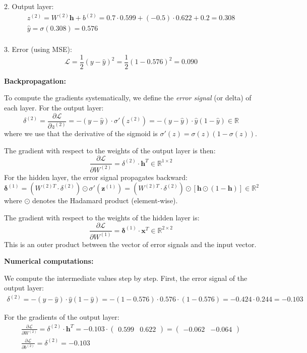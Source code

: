 2. Output layer:
\begin{gather*}
    z^{(2)} = W^{(2)}\mathbf{h} + b^{(2)} = 0.7 \cdot 0.599 + (-0.5) \cdot 0.622 + 0.2 = 0.308\\
    \hat{y} = \sigma(0.308) = 0.576\\
\end{gather*}

3. Error (using \gls{MSE}):
\[
	\mathcal{L} = \frac{1}{2}(y - \hat{y})^2 = \frac{1}{2}(1 - 0.576)^2 = 0.090
\]

\textbf{Backpropagation:}

To compute the gradients systematically, we define the \textit{error signal} (or delta) of each layer. For the output layer:
\[
	\delta^{(2)} = \frac{\partial \mathcal{L}}{\partial z^{(2)}} = -(y - \hat{y}) \cdot \sigma'(z^{(2)}) = -(y - \hat{y}) \cdot \hat{y}(1 - \hat{y}) \in \mathbb{R}
\]
where we use that the derivative of the sigmoid is \(\sigma'(z) = \sigma(z)(1-\sigma(z))\).

The gradient with respect to the weights of the output layer is then:
\[
	\frac{\partial \mathcal{L}}{\partial W^{(2)}} = \delta^{(2)} \cdot \mathbf{h}^T \in \mathbb{R}^{1 \times 2}
\]
For the hidden layer, the error signal propagates backward:
\[
	\boldsymbol{\delta}^{(1)} = \left( W^{(2)T} \cdot \delta^{(2)} \right) \odot \sigma'(\mathbf{z}^{(1)}) = \left( W^{(2)T} \cdot \delta^{(2)} \right) \odot \left[ \mathbf{h} \odot (1 - \mathbf{h}) \right] \in \mathbb{R}^{2}
\]
where \(\odot\) denotes the Hadamard product (element-wise).

The gradient with respect to the weights of the hidden layer is:
\[
	\frac{\partial \mathcal{L}}{\partial W^{(1)}} = \boldsymbol{\delta}^{(1)} \cdot \mathbf{x}^T \in \mathbb{R}^{2 \times 2}
\]
This is an outer product between the vector of error signals and the input vector.

\textbf{Numerical computations:}

We compute the intermediate values step by step. First, the error signal of the output layer:
\begin{gather*}
	\delta^{(2)} = -(y - \hat{y}) \cdot \hat{y}(1 - \hat{y}) = -(1 - 0.576) \cdot 0.576 \cdot (1 - 0.576) = -0.424 \cdot 0.244 = -0.103
\end{gather*}

For the gradients of the output layer:
\begin{gather*}
	\frac{\partial \mathcal{L}}{\partial W^{(2)}} = \delta^{(2)} \cdot \mathbf{h}^T = -0.103 \cdot \begin{pmatrix} 0.599 & 0.622 \end{pmatrix} = \begin{pmatrix} -0.062 & -0.064 \end{pmatrix} \\[0.3em]
	\frac{\partial \mathcal{L}}{\partial b^{(2)}} = \delta^{(2)} = -0.103
\end{gather*}

